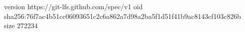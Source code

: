 version https://git-lfs.github.com/spec/v1
oid sha256:76f7ac4b51cc06093651c2c6a862a7d98a2ba5f1d51f41b9ac8143cf103c826b
size 272234
